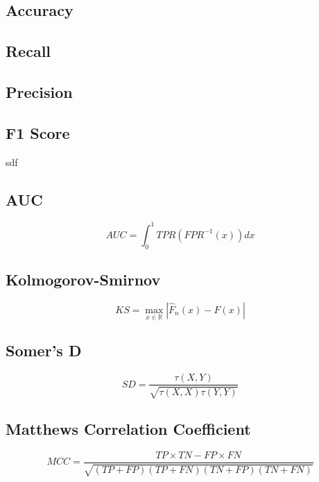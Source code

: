 \subsection{Accuracy}
\subsection{Recall}
\subsection{Precision}
\subsection{F1 Score}
sdf
\subsection{AUC}

\begin{equation}\label{eq}
    AUC = \int_{0}^{1} TPR \left(FPR^{-1}\left(x \right)\right) dx
\end{equation}

\subsection{Kolmogorov-Smirnov}

\begin{equation}\label{eq}
    KS = \max_{x \in \mathbb{R}} \left| \hat{F}_n \left(x \right) - F \left(x \right) \right|
\end{equation}


\subsection{Somer's D}

\begin{equation}\label{eq}
    SD = \frac{\tau \left(X, Y\right)}{\sqrt{\tau \left(X, X\right) \tau \left(Y, Y\right)}}
\end{equation}


\subsection{Matthews Correlation Coefficient}

\begin{equation}\label{eq}
    MCC = \frac{TP \times TN - FP \times FN}{\sqrt{(TP + FP) (TP + FN) (TN + FP) (TN + FN)}}
\end{equation}


